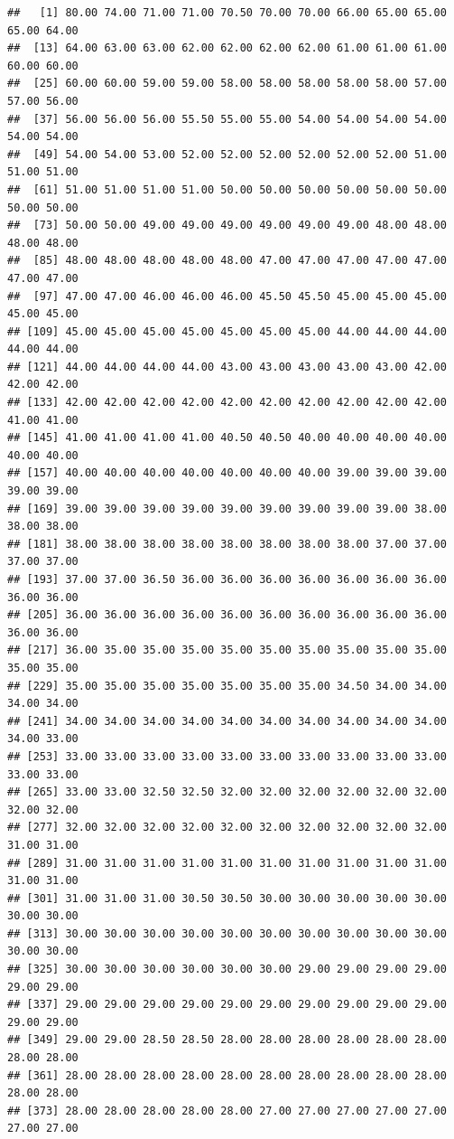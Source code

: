 \documentclass[11pt,]{book}
\begin{document}
\begin{verbatim}
##   [1] 80.00 74.00 71.00 71.00 70.50 70.00 70.00 66.00 65.00 65.00 65.00 64.00
##  [13] 64.00 63.00 63.00 62.00 62.00 62.00 62.00 61.00 61.00 61.00 60.00 60.00
##  [25] 60.00 60.00 59.00 59.00 58.00 58.00 58.00 58.00 58.00 57.00 57.00 56.00
##  [37] 56.00 56.00 56.00 55.50 55.00 55.00 54.00 54.00 54.00 54.00 54.00 54.00
##  [49] 54.00 54.00 53.00 52.00 52.00 52.00 52.00 52.00 52.00 51.00 51.00 51.00
##  [61] 51.00 51.00 51.00 51.00 50.00 50.00 50.00 50.00 50.00 50.00 50.00 50.00
##  [73] 50.00 50.00 49.00 49.00 49.00 49.00 49.00 49.00 48.00 48.00 48.00 48.00
##  [85] 48.00 48.00 48.00 48.00 48.00 47.00 47.00 47.00 47.00 47.00 47.00 47.00
##  [97] 47.00 47.00 46.00 46.00 46.00 45.50 45.50 45.00 45.00 45.00 45.00 45.00
## [109] 45.00 45.00 45.00 45.00 45.00 45.00 45.00 44.00 44.00 44.00 44.00 44.00
## [121] 44.00 44.00 44.00 44.00 43.00 43.00 43.00 43.00 43.00 42.00 42.00 42.00
## [133] 42.00 42.00 42.00 42.00 42.00 42.00 42.00 42.00 42.00 42.00 41.00 41.00
## [145] 41.00 41.00 41.00 41.00 40.50 40.50 40.00 40.00 40.00 40.00 40.00 40.00
## [157] 40.00 40.00 40.00 40.00 40.00 40.00 40.00 39.00 39.00 39.00 39.00 39.00
## [169] 39.00 39.00 39.00 39.00 39.00 39.00 39.00 39.00 39.00 38.00 38.00 38.00
## [181] 38.00 38.00 38.00 38.00 38.00 38.00 38.00 38.00 37.00 37.00 37.00 37.00
## [193] 37.00 37.00 36.50 36.00 36.00 36.00 36.00 36.00 36.00 36.00 36.00 36.00
## [205] 36.00 36.00 36.00 36.00 36.00 36.00 36.00 36.00 36.00 36.00 36.00 36.00
## [217] 36.00 35.00 35.00 35.00 35.00 35.00 35.00 35.00 35.00 35.00 35.00 35.00
## [229] 35.00 35.00 35.00 35.00 35.00 35.00 35.00 34.50 34.00 34.00 34.00 34.00
## [241] 34.00 34.00 34.00 34.00 34.00 34.00 34.00 34.00 34.00 34.00 34.00 33.00
## [253] 33.00 33.00 33.00 33.00 33.00 33.00 33.00 33.00 33.00 33.00 33.00 33.00
## [265] 33.00 33.00 32.50 32.50 32.00 32.00 32.00 32.00 32.00 32.00 32.00 32.00
## [277] 32.00 32.00 32.00 32.00 32.00 32.00 32.00 32.00 32.00 32.00 31.00 31.00
## [289] 31.00 31.00 31.00 31.00 31.00 31.00 31.00 31.00 31.00 31.00 31.00 31.00
## [301] 31.00 31.00 31.00 30.50 30.50 30.00 30.00 30.00 30.00 30.00 30.00 30.00
## [313] 30.00 30.00 30.00 30.00 30.00 30.00 30.00 30.00 30.00 30.00 30.00 30.00
## [325] 30.00 30.00 30.00 30.00 30.00 30.00 29.00 29.00 29.00 29.00 29.00 29.00
## [337] 29.00 29.00 29.00 29.00 29.00 29.00 29.00 29.00 29.00 29.00 29.00 29.00
## [349] 29.00 29.00 28.50 28.50 28.00 28.00 28.00 28.00 28.00 28.00 28.00 28.00
## [361] 28.00 28.00 28.00 28.00 28.00 28.00 28.00 28.00 28.00 28.00 28.00 28.00
## [373] 28.00 28.00 28.00 28.00 28.00 27.00 27.00 27.00 27.00 27.00 27.00 27.00

\end{verbatim}
\end{document}
